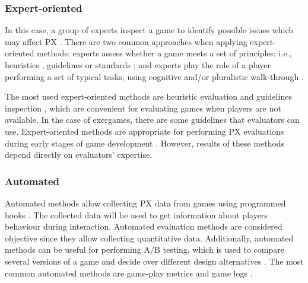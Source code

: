 \subsubsection{Expert-oriented}
In this case, a group of experts inspect a game to identify possible issues which may affect PX \autocite{Bernhaupt2015,Yanez-Gomez2017}. There are two common approaches when applying expert-oriented methods: experts assess whether a game meets a set of principles; i.e., heuristics \autocite{Yanez-Gomez2017,Wiemeyer2016,Nacke2015,desurvire_methods_2013,Nackea,Nacke2009,Desurvire2009,Federoff2002}, guidelines or standards \autocite{Yanez-Gomez2017}; and experts play the role of a player performing a set of typical tasks, using cognitive and/or pluralistic walk-through \autocite{Yanez-Gomez2017}.

The most used expert-oriented methods are heuristic evaluation \autocite{Desurvire2009,Federoff2002,Hochleitner2015,Tondello2016} and guidelines inspection \autocite{Yanez-Gomez2017}, which are convenient for evaluating games when players are not available. In the case of exergames, there are some guidelines \autocite{Wiemeyer2015,Pasch2009,Isbister2015,Mueller2014} that evaluators can use. Expert-oriented methods are appropriate for performing PX evaluations during early stages of game development \autocite{Bernhaupt2015,McAllister2015,desurvire_methods_2013}. However, results of these methods depend directly on evaluators’ expertise. 

\subsubsection{Automated}
Automated methods allow collecting \ac{PX} data from games using programmed hooks \autocite{Nacke2015}. The collected data will be used to get information about players behaviour during interaction. Automated evaluation methods are considered objective since they allow collecting quantitative data. Additionally, automated methods can be useful for performing A/B testing, which is used to compare several versions of a game and decide over different design alternatives \autocite{desurvire_methods_2013}. The most common automated methods are game-play metrics \autocite{Nacke2015} and game logs \autocite{Drachen2013,Wiemeyer2016}.

